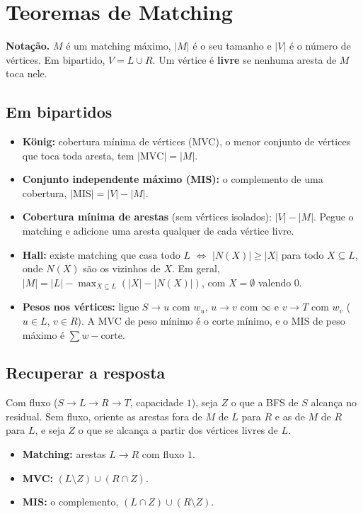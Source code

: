 \section{Teoremas de Matching}

\textbf{Notação.} $M$ é um matching máximo, $|M|$ é o seu tamanho e $|V|$ é o número de vértices. Em bipartido,
$V = L \cup R$. Um vértice é \textbf{livre} se nenhuma aresta de $M$ toca nele.

\subsection*{Em bipartidos}

\begin{itemize}
  \item \textbf{König:} cobertura mínima de vértices (MVC), o menor conjunto de vértices que toca toda aresta,
        tem $|\text{MVC}| = |M|$.
  \item \textbf{Conjunto independente máximo (MIS):} o complemento de uma cobertura, $|\text{MIS}| = |V| - |M|$.
  \item \textbf{Cobertura mínima de arestas} (sem vértices isolados): $|V| - |M|$. Pegue o matching e adicione uma
        aresta qualquer de cada vértice livre.
  \item \textbf{Hall:} existe matching que casa todo $L$ $\iff$ $|N(X)| \ge |X|$ para todo $X \subseteq L$, onde
        $N(X)$ são os vizinhos de $X$. Em geral, $|M| = |L| - \max_{X \subseteq L} (|X| - |N(X)|)$, com
        $X = \emptyset$ valendo $0$.
  \item \textbf{Pesos nos vértices:} ligue $S \to u$ com $w_u$, $u \to v$ com $\infty$ e $v \to T$ com $w_v$
        ($u \in L$, $v \in R$). A MVC de peso mínimo é o corte mínimo, e o MIS de peso máximo é $\sum w - \text{corte}$.
\end{itemize}

\subsection*{Recuperar a resposta}

Com fluxo ($S \to L \to R \to T$, capacidade $1$), seja $Z$ o que a BFS de $S$ alcança no residual. Sem fluxo,
oriente as arestas fora de $M$ de $L$ para $R$ e as de $M$ de $R$ para $L$, e seja $Z$ o que se alcança a partir
dos vértices livres de $L$.
\begin{itemize}
  \item \textbf{Matching:} arestas $L \to R$ com fluxo $1$.
  \item \textbf{MVC:} $(L \setminus Z) \cup (R \cap Z)$.
  \item \textbf{MIS:} o complemento, $(L \cap Z) \cup (R \setminus Z)$.
\end{itemize}

